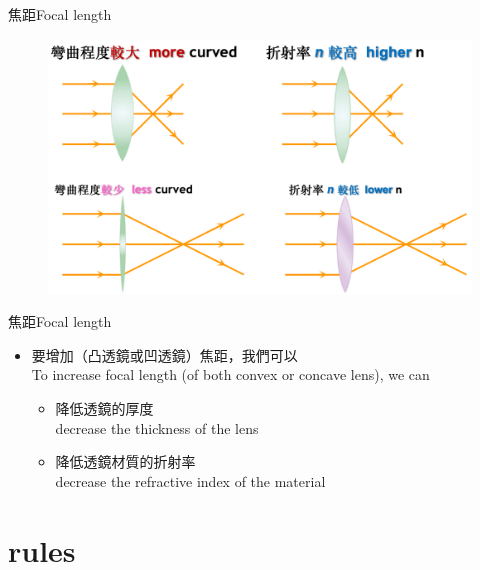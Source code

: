 \documentclass[beamer=true]{standalone}
\begin{document}
\begin{frame}{焦距Focal length}
    \begin{figure}
        \centering
        \includegraphics[width=1\linewidth]{assets/x91bey74r.png}


    \end{figure}
\end{frame}

\begin{frame}{焦距Focal length}
    \begin{itemize}
        \setlength{\itemsep}{0.6em}
        \item 要增加（凸透鏡或凹透鏡）焦距，我們可以\\To increase focal length (of both convex or concave lens), we can
              \begin{itemize}
                  \item 降低透鏡的厚度\\decrease the thickness of the lens
                  \item 降低透鏡材質的折射率\\decrease the refractive index of the material
              \end{itemize}
    \end{itemize}
\end{frame}

\section{rules}
\end{document}
